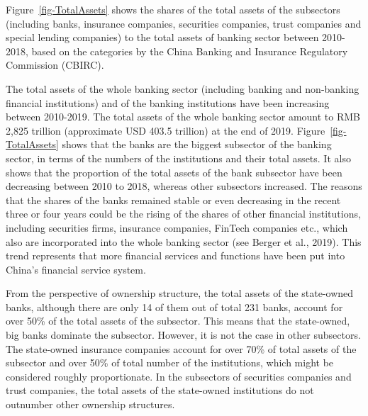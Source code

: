 \documentclass[
  12pt,
  a4paper,
  DIV=11,
  numbers=noendperiod]{scrreprt}
\begin{document}
Figure~\ref{fig-TotalAssets} shows the shares of the total assets of the
subsectors (including banks, insurance companies, securities companies,
trust companies and special lending companies) to the total assets of
banking sector between 2010-2018, based on the categories by the China
Banking and Insurance Regulatory Commission (CBIRC).

The total assets of the whole banking sector (including banking and
non-banking financial institutions) and of the banking institutions have
been increasing between 2010-2019. The total assets of the whole banking
sector amount to RMB 2,825 trillion (approximate USD 403.5 trillion) at
the end of 2019. Figure~\ref{fig-TotalAssets} shows that the banks are
the biggest subsector of the banking sector, in terms of the numbers of
the institutions and their total assets. It also shows that the
proportion of the total assets of the bank subsector have been
decreasing between 2010 to 2018, whereas other subsectors increased. The
reasons that the shares of the banks remained stable or even decreasing
in the recent three or four years could be the rising of the shares of
other financial institutions, including securities firms, insurance
companies, FinTech companies etc., which also are incorporated into the
whole banking sector (see Berger et al., 2019). This trend represents
that more financial services and functions have been put into China's
financial service system.

From the perspective of ownership structure, the total assets of the
state-owned banks, although there are only 14 of them out of total 231
banks, account for over 50\% of the total assets of the subsector. This
means that the state-owned, big banks dominate the subsector. However,
it is not the case in other subsectors. The state-owned insurance
companies account for over 70\% of total assets of the subsector and
over 50\% of total number of the institutions, which might be considered
roughly proportionate. In the subsectors of securities companies and
trust companies, the total assets of the state-owned institutions do not
outnumber other ownership structures.
\end{document}

